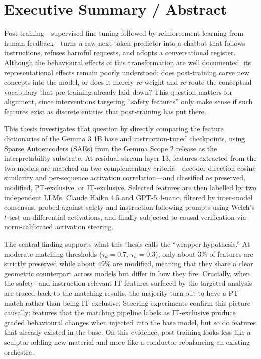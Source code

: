 \section{Executive Summary / Abstract}
\label{sec:abstract}

Post-training---supervised fine-tuning followed by reinforcement learning from human feedback---turns a raw next-token predictor into a chatbot that follows instructions, refuses harmful requests, and adopts a conversational register. Although the behavioural effects of this transformation are well documented, its representational effects remain poorly understood: does post-training carve new concepts into the model, or does it merely re-weight and re-route the conceptual vocabulary that pre-training already laid down? This question matters for alignment, since interventions targeting ``safety features'' only make sense if such features exist as discrete entities that post-training has put there.

This thesis investigates that question by directly comparing the feature dictionaries of the Gemma 3 1B base and instruction-tuned checkpoints, using Sparse Autoencoders (SAEs) from the Gemma Scope 2 release as the interpretability substrate. At residual-stream layer 13, features extracted from the two models are matched on two complementary criteria---decoder-direction cosine similarity and per-sequence activation correlation---and classified as preserved, modified, PT-exclusive, or IT-exclusive. Selected features are then labelled by two independent LLMs, Claude Haiku 4.5 and GPT-5.4-nano, filtered by inter-model consensus, probed against safety and instruction-following prompts using Welch's $t$-test on differential activations, and finally subjected to causal verification via norm-calibrated activation steering.

The central finding supports what this thesis calls the ``wrapper hypothesis.'' At moderate matching thresholds ($\tau_d = 0.7$, $\tau_a = 0.3$), only about 3\% of features are strictly preserved while about 49\% are modified, meaning that they share a clear geometric counterpart across models but differ in how they fire. Crucially, when the safety- and instruction-relevant IT features surfaced by the targeted analysis are traced back to the matching results, the majority turn out to have a PT match rather than being IT-exclusive. Steering experiments confirm this picture causally: features that the matching pipeline labels as IT-exclusive produce graded behavioural changes when injected into the base model, but so do features that already existed in the base. On this evidence, post-training looks less like a sculptor adding new material and more like a conductor rebalancing an existing orchestra.

